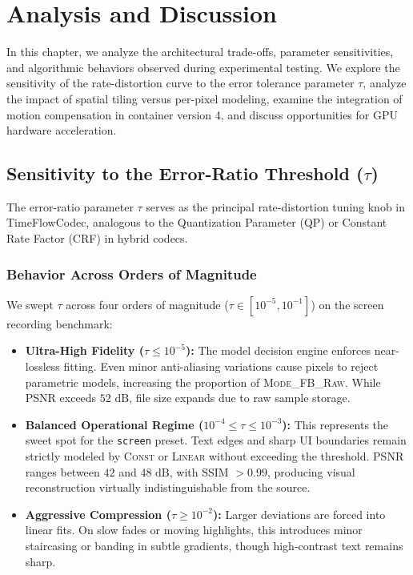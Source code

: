 \chapter{Analysis and Discussion}
\label{chap:discussion}

In this chapter, we analyze the architectural trade-offs, parameter sensitivities, and algorithmic behaviors observed during experimental testing. We explore the sensitivity of the rate-distortion curve to the error tolerance parameter $\tau$, analyze the impact of spatial tiling versus per-pixel modeling, examine the integration of motion compensation in container version 4, and discuss opportunities for GPU hardware acceleration.

\section{Sensitivity to the Error-Ratio Threshold ($\tau$)}
The error-ratio parameter $\tau$ serves as the principal rate-distortion tuning knob in TimeFlowCodec, analogous to the Quantization Parameter (QP) or Constant Rate Factor (CRF) in hybrid codecs.

\subsection{Behavior Across Orders of Magnitude}
We swept $\tau$ across four orders of magnitude ($\tau \in [10^{-5}, 10^{-1}]$) on the screen recording benchmark:
\begin{itemize}
    \item \textbf{Ultra-High Fidelity ($\tau \le 10^{-5}$):} The model decision engine enforces near-lossless fitting. Even minor anti-aliasing variations cause pixels to reject parametric models, increasing the proportion of \textsc{Mode\_FB\_Raw}. While PSNR exceeds $52\text{ dB}$, file size expands due to raw sample storage.
    \item \textbf{Balanced Operational Regime ($10^{-4} \le \tau \le 10^{-3}$):} This represents the sweet spot for the \texttt{screen} preset. Text edges and sharp UI boundaries remain strictly modeled by \textsc{Const} or \textsc{Linear} without exceeding the threshold. PSNR ranges between $42$ and $48\text{ dB}$, with SSIM $> 0.99$, producing visual reconstruction virtually indistinguishable from the source.
    \item \textbf{Aggressive Compression ($\tau \ge 10^{-2}$):} Larger deviations are forced into linear fits. On slow fades or moving highlights, this introduces minor staircasing or banding in subtle gradients, though high-contrast text remains sharp.
\end{itemize}

